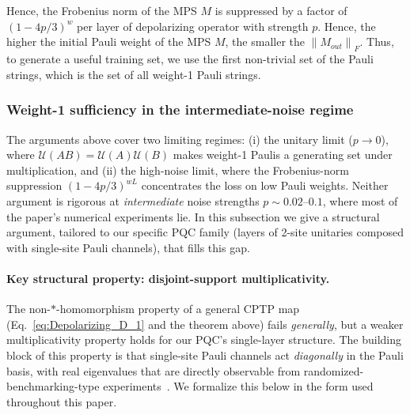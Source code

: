 \documentclass[%
 reprint,
superscriptaddress,
 amsmath,amssymb,
 aps,
]{revtex4-2}
\newcommand{\norm}[1]{\left\lVert#1\right\rVert}
\begin{document}

Hence, the Frobenius norm of the MPS $M$ is suppressed by a factor of $(1-4p/3)^w$ per layer of depolarizing operator with strength $p$. Hence, the higher the initial Pauli weight of the MPS $M$, the smaller the $\norm{M_{out}}_F$. Thus, to generate a useful training set, we use the first non-trivial set of the Pauli strings, which is the set of all weight-1 Pauli strings.

\subsubsection{Weight-1 sufficiency in the intermediate-noise regime}
\label{sec:intermediate_noise_sufficiency}

The arguments above cover two limiting regimes: (i) the unitary limit ($p\to 0$), where $\mathcal{U}(AB) = \mathcal{U}(A)\mathcal{U}(B)$ makes weight-1 Paulis a generating set under multiplication, and (ii) the high-noise limit, where the Frobenius-norm suppression $(1-4p/3)^{wL}$ concentrates the loss on low Pauli weights. Neither argument is rigorous at \emph{intermediate} noise strengths $p\sim 0.02$--$0.1$, where most of the paper's numerical experiments lie. In this subsection we give a structural argument, tailored to our specific PQC family (layers of 2-site unitaries composed with single-site Pauli channels), that fills this gap.

\paragraph*{Key structural property: disjoint-support multiplicativity.}
The non-$*$-homomorphism property of a general CPTP map (Eq.~\eqref{eq:Depolarizing_D_1} and the theorem above) fails \emph{generally}, but a weaker multiplicativity property holds for our PQC's single-layer structure. The building block of this property is that single-site Pauli channels act \emph{diagonally} in the Pauli basis, with real eigenvalues that are directly observable from randomized-benchmarking-type experiments~\cite{magesan2012characterizing,flammia2020pauli,harper2020efficient}. We formalize this below in the form used throughout this paper.
\end{document}
